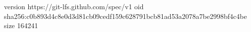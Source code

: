 version https://git-lfs.github.com/spec/v1
oid sha256:c0b893d4c8e0d3d81cb09cedf159c628791bcb81ad53a2078a7be2998bf4c4be
size 164241
